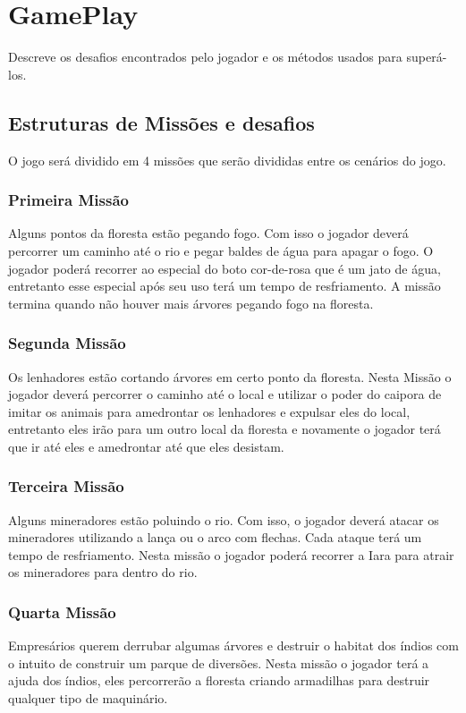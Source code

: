 \section {GamePlay}
\label{ap:gameplay}
Descreve os desafios encontrados pelo jogador e os métodos usados para superá-los.

\subsection {Estruturas de Missões e desafios}
O jogo será dividido em 4 missões que serão divididas entre os cenários do jogo.

\subsubsection{Primeira Missão}
Alguns pontos da floresta estão pegando fogo. Com isso o jogador deverá percorrer um caminho até o rio e pegar baldes de água para apagar o fogo. O jogador poderá recorrer ao especial do boto cor-de-rosa que é um jato de água, entretanto esse especial após seu uso terá um tempo de resfriamento. A missão termina quando não houver mais árvores pegando fogo na floresta.

\subsubsection{Segunda Missão}
Os lenhadores estão cortando árvores em certo ponto da floresta. Nesta Missão o jogador deverá percorrer o caminho até o local e utilizar o poder do caipora de imitar os animais para amedrontar os lenhadores e expulsar eles do local, entretanto eles irão para um outro local da floresta e novamente o jogador terá que ir até eles e amedrontar até que eles desistam.

\subsubsection{Terceira Missão}
Alguns mineradores estão poluindo o rio. Com isso, o jogador deverá atacar os mineradores utilizando a lança ou o arco com flechas. Cada ataque terá um tempo de resfriamento. Nesta missão o jogador poderá recorrer a Iara para atrair os mineradores para dentro do rio.

\subsubsection{Quarta Missão}
Empresários querem derrubar algumas árvores e destruir o habitat dos índios com o intuito de construir um parque de diversões. Nesta missão o jogador terá a ajuda dos índios, eles percorrerão a floresta criando armadilhas para destruir qualquer tipo de maquinário.


